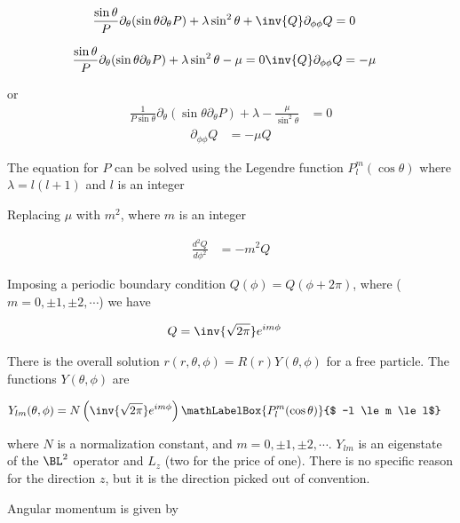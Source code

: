 \begin{align*}
\frac{\sin\theta}{P } \partial_\theta (\sin\theta \partial_\theta P)
+\lambda  \sin^2\theta
+ \inv{Q } \partial_{\phi\phi} Q &= 0
\end{align*}

\begin{align*}
\frac{\sin\theta}{P } \partial_\theta (\sin\theta \partial_\theta P) + \lambda \sin^2\theta - \mu = 0
\inv{Q } \partial_{\phi\phi} Q &= -\mu
\end{align*}

or
\begin{align}\label{eqn:PHY356F:1000}
\frac{1}{P \sin\theta} \partial_\theta (\sin\theta \partial_\theta P) +\lambda -\frac{\mu}{\sin^2\theta} &= 0
\end{align}
\begin{align}\label{eqn:PHY356F:2000}
\partial_{\phi\phi} Q &= -\mu Q
\end{align}

The equation for $P$ can be solved using the Legendre function $P_l^m(\cos\theta)$ where $\lambda = l(l+1)$ and $l$ is an integer

Replacing $\mu$ with $m^2$, where $m$ is an integer

\begin{align*}
\frac{d^2 Q}{d\phi^2} &= -m^2 Q
\end{align*}

Imposing a periodic boundary condition $Q(\phi) = Q(\phi + 2\pi)$, where ($m = 0, \pm 1, \pm 2, \cdots$) we have

\begin{align*}
Q &= \inv{\sqrt{2\pi}} e^{im\phi}
\end{align*}

There is the overall solution $r(r,\theta,\phi) = R(r) Y(\theta, \phi)$ for a free particle.  The functions $Y(\theta, \phi)$ are

\begin{align*}
Y_{lm}(\theta, \phi)
&= N \left( \inv{\sqrt{2\pi}} e^{im\phi} \right) 
\mathLabelBox{ P_l^m(\cos\theta) }{$ -l \le m \le l$}
\end{align*}

where $N$ is a normalization constant, and $m = 0, \pm 1, \pm 2, \cdots$.  $Y_{lm}$ is an eigenstate of the $\BL^2$ operator and $L_z$ (two for the price of one).  There is no specific reason for the direction $z$, but it is the direction picked out of convention.

Angular momentum is given by

